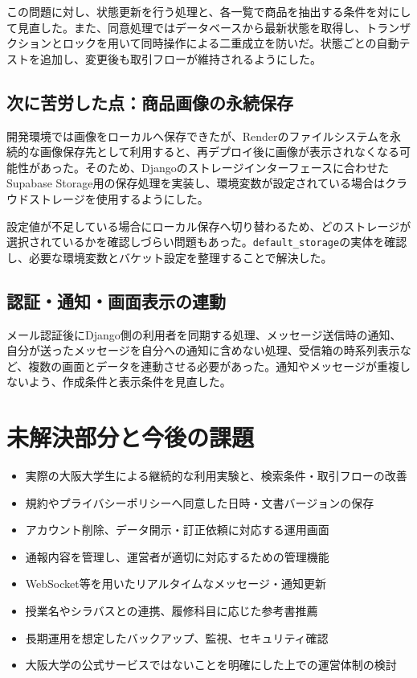 \documentclass[11pt,a4paper]{article}
\begin{document}
この問題に対し、状態更新を行う処理と、各一覧で商品を抽出する条件を対にして見直した。また、同意処理ではデータベースから最新状態を取得し、トランザクションとロックを用いて同時操作による二重成立を防いだ。状態ごとの自動テストを追加し、変更後も取引フローが維持されるようにした。

\subsection{次に苦労した点：商品画像の永続保存}

開発環境では画像をローカルへ保存できたが、Renderのファイルシステムを永続的な画像保存先として利用すると、再デプロイ後に画像が表示されなくなる可能性があった。そのため、Djangoのストレージインターフェースに合わせたSupabase Storage用の保存処理を実装し、環境変数が設定されている場合はクラウドストレージを使用するようにした。

設定値が不足している場合にローカル保存へ切り替わるため、どのストレージが選択されているかを確認しづらい問題もあった。\texttt{default\_storage}の実体を確認し、必要な環境変数とバケット設定を整理することで解決した。

\subsection{認証・通知・画面表示の連動}

メール認証後にDjango側の利用者を同期する処理、メッセージ送信時の通知、自分が送ったメッセージを自分への通知に含めない処理、受信箱の時系列表示など、複数の画面とデータを連動させる必要があった。通知やメッセージが重複しないよう、作成条件と表示条件を見直した。

\section{未解決部分と今後の課題}

\begin{itemize}
  \item 実際の大阪大学生による継続的な利用実験と、検索条件・取引フローの改善
  \item 規約やプライバシーポリシーへ同意した日時・文書バージョンの保存
  \item アカウント削除、データ開示・訂正依頼に対応する運用画面
  \item 通報内容を管理し、運営者が適切に対応するための管理機能
  \item WebSocket等を用いたリアルタイムなメッセージ・通知更新
  \item 授業名やシラバスとの連携、履修科目に応じた参考書推薦
  \item 長期運用を想定したバックアップ、監視、セキュリティ確認
  \item 大阪大学の公式サービスではないことを明確にした上での運営体制の検討
\end{itemize}
\end{document}
